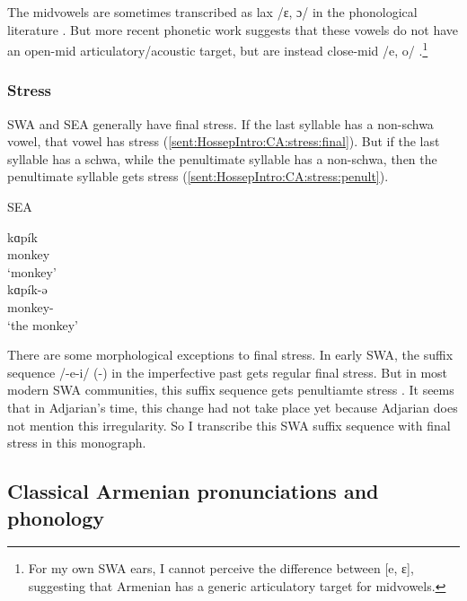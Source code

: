 \documentclass[output=paper]{langscibook}
\begin{document}
The midvowels are sometimes transcribed as lax /ɛ, ɔ/ in the phonological literature \citep{Vaux-1998-ArmenianPhono}. But more recent phonetic work suggests that these vowels do not have an open-mid articulatory/acoustic target, but are instead close-mid /e, o/ \citep{Toparlak-2019-MAArmenianPhonetics,Seyfarth-JIPAArmenian}.\footnote{For my own SWA ears, I cannot perceive the difference between [e, ɛ], suggesting that Armenian has a generic articulatory target for midvowels.}

\subsubsection{Stress}\label{sec:HossepIntro:phonotransc:modern:stress}

SWA and SEA generally have final stress. If the last syllable has a non-schwa vowel, that vowel has stress (\ref{sent:HossepIntro:CA:stress:final}). But if the last syllable has a schwa, while the penultimate syllable has a non-schwa, then the penultimate syllable gets stress (\ref{sent:HossepIntro:CA:stress:penult}). 

\begin{exe}
	\ex SEA \label{sent:HossepIntro:CA:stress}
	\begin{xlist}
		\ex \gll kɑp\'ik \\
		monkey \\
		\trans `monkey' \label{sent:HossepIntro:CA:stress:final}\\
		\ex \gll kɑp\'ik-ə \\
		monkey-{} \\
		\trans `the monkey' \label{sent:HossepIntro:CA:stress:penult} \\
	\end{xlist}
\end{exe}

There are some morphological exceptions to final stress. In early SWA, the suffix sequence /-e-i/ ({\thgloss}-{\pst}) in the imperfective past gets regular final stress. But in  most modern SWA communities, this suffix sequence gets penultiamte stress \citep{Dolatian-prep-ArmenianThemeAllomorphyOutputProsodyPeriphrasis}. It seems that in Adjarian's time, this change had not take place yet because Adjarian does not mention this irregularity. So I transcribe this SWA suffix sequence with final stress in this monograph. 

\subsection{Classical Armenian pronunciations and phonology}\label{sec:HossepIntro:phonotransc:CA}
\end{document}
